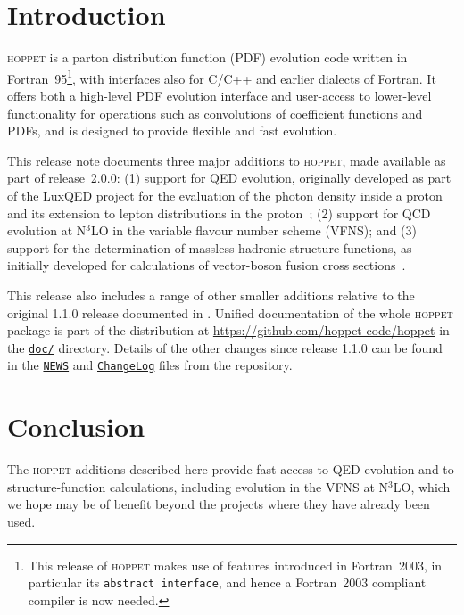 \documentclass[preprint,1p,a4paper,11pt]{elsarticle}
\newcommand{\hoppet}{\textsc{hoppet}\xspace}
\newcommand{\ttt}[1]{\texttt{#1}}
\newcommand{\repolink}[2]{\href{https://github.com/hoppet-code/hoppet/blob/master/#1}{\ttt{#2}}}
\newcommand{\masterlink}[1]{\repolink{#1}{#1}}
\begin{document}
\section{Introduction}

\hoppet is a parton distribution function (PDF) evolution code written
in Fortran~95\footnote{This release of \hoppet makes use of features
introduced in Fortran~2003, in particular its \ttt{abstract
  interface}, and hence a Fortran~2003 compliant compiler is now needed.},
with interfaces also for C/C++ and earlier dialects of Fortran.
%
It offers both a high-level PDF evolution interface and user-access to
lower-level functionality for operations such as convolutions of
coefficient functions and PDFs, and is designed to provide flexible and
fast evolution.

This release note documents three major additions to \hoppet, made
available as part of release~2.0.0: (1) support for QED evolution,
originally developed as part of the LuxQED project for the evaluation
of the photon density inside a proton and its extension to lepton
distributions in the
proton~\cite{Manohar:2016nzj,Manohar:2017eqh,Buonocore:2020nai,Buonocore:2021bsf};
%
(2) support for QCD evolution at N$^3$LO in the variable flavour number scheme (VFNS);
%
and (3) support for the
determination of massless hadronic structure functions, as initially developed
for calculations of vector-boson fusion cross
sections~\cite{Cacciari:2015jma,Dreyer:2016oyx,Dreyer:2018qbw,Dreyer:2018rfu}.

This release also includes a range of other smaller additions relative
to the original 1.1.0 release documented in
\cite{Salam:2008qg}.
%
Unified documentation of the whole \hoppet package is part of the
distribution at \url{https://github.com/hoppet-code/hoppet} in the
\masterlink{doc/} directory.
%
Details of the other changes since release 1.1.0 can be found in the
\masterlink{NEWS} and \masterlink{ChangeLog} files from the
repository.





\section{Conclusion}

The \hoppet additions described here provide fast access to QED
evolution and to structure-function calculations, including evolution
in the VFNS at N$^3$LO, which we hope may be of benefit beyond the
projects where they have already been used.
\end{document}
